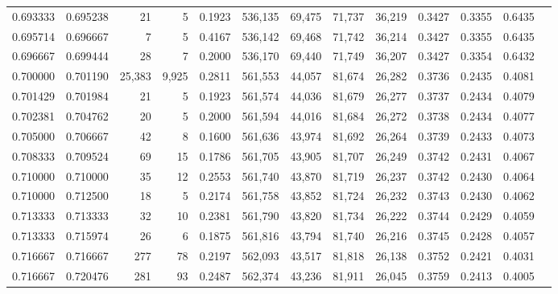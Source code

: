 \begin{tabular}{rrrrrrrrrrrrr}
0.693333 & 0.695238 &     21 &      5 &                                     0.1923 & 536,135 &  69,475 &  71,737 &  36,219 & 0.3427 & 0.3355 & 0.6435 \\
0.695714 & 0.696667 &      7 &      5 &                                     0.4167 & 536,142 &  69,468 &  71,742 &  36,214 & 0.3427 & 0.3355 & 0.6435 \\
0.696667 & 0.699444 &     28 &      7 &                                     0.2000 & 536,170 &  69,440 &  71,749 &  36,207 & 0.3427 & 0.3354 & 0.6432 \\
0.700000 & 0.701190 & 25,383 &  9,925 &                                     0.2811 & 561,553 &  44,057 &  81,674 &  26,282 & 0.3736 & 0.2435 & 0.4081 \\
0.701429 & 0.701984 &     21 &      5 &                                     0.1923 & 561,574 &  44,036 &  81,679 &  26,277 & 0.3737 & 0.2434 & 0.4079 \\
0.702381 & 0.704762 &     20 &      5 &                                     0.2000 & 561,594 &  44,016 &  81,684 &  26,272 & 0.3738 & 0.2434 & 0.4077 \\
0.705000 & 0.706667 &     42 &      8 &                                     0.1600 & 561,636 &  43,974 &  81,692 &  26,264 & 0.3739 & 0.2433 & 0.4073 \\
0.708333 & 0.709524 &     69 &     15 &                                     0.1786 & 561,705 &  43,905 &  81,707 &  26,249 & 0.3742 & 0.2431 & 0.4067 \\
0.710000 & 0.710000 &     35 &     12 &                                     0.2553 & 561,740 &  43,870 &  81,719 &  26,237 & 0.3742 & 0.2430 & 0.4064 \\
0.710000 & 0.712500 &     18 &      5 &                                     0.2174 & 561,758 &  43,852 &  81,724 &  26,232 & 0.3743 & 0.2430 & 0.4062 \\
0.713333 & 0.713333 &     32 &     10 &                                     0.2381 & 561,790 &  43,820 &  81,734 &  26,222 & 0.3744 & 0.2429 & 0.4059 \\
0.713333 & 0.715974 &     26 &      6 &                                     0.1875 & 561,816 &  43,794 &  81,740 &  26,216 & 0.3745 & 0.2428 & 0.4057 \\
0.716667 & 0.716667 &    277 &     78 &                                     0.2197 & 562,093 &  43,517 &  81,818 &  26,138 & 0.3752 & 0.2421 & 0.4031 \\
0.716667 & 0.720476 &    281 &     93 &                                     0.2487 & 562,374 &  43,236 &  81,911 &  26,045 & 0.3759 & 0.2413 & 0.4005 \\

\end{tabular}
